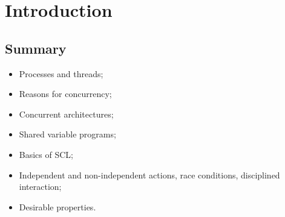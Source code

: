 \chapter{Introduction}
\label{chap:intro}





\section{Summary}

\begin{itemize}
\item
Processes and threads;

\item
Reasons for concurrency;

\item
Concurrent architectures;

\item
Shared variable programs; 

\item
Basics of SCL;

\item
Independent and non-independent actions, race conditions, disciplined
interaction; 

\item
Desirable properties.
\end{itemize}


\exercises








